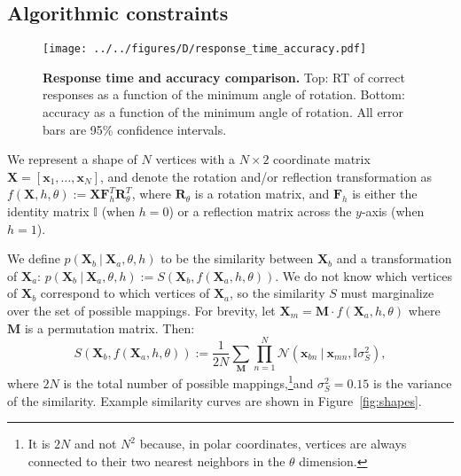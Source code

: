 \documentclass[10pt,letterpaper]{article}
\newcommand{\Xa}[0]{\mathbf{X}_a}
\newcommand{\Xb}[0]{\mathbf{X}_b}
\newcommand{\R}[0]{\mathbf{R}_\theta}
\newcommand{\F}[0]{\mathbf{F}}
\newcommand{\M}[0]{\mathbf{M}}
\newcommand{\I}[0]{\mathbb{I}}
\newcommand{\hi}[0]{h=0}
\newcommand{\hf}[0]{h=1}
\begin{document}
\subsection{Algorithmic constraints}

\begin{figure*}[t]
  \begin{center}
    \texttt{[image: ../../figures/D/response\_time\_accuracy.pdf]}
    \caption{\textbf{Response time and accuracy comparison.} Top: RT
      of correct responses as a function of the minimum angle of
      rotation. Bottom: accuracy as a function of the minimum angle of
      rotation. All error bars are 95\% confidence intervals.}
    \label{fig:response-time-accuracy}
  \end{center}
\end{figure*}

We represent a shape of $N$ vertices with a $N\times 2$ coordinate
matrix $\mathbf{X}=[\mathbf{x}_1, \ldots{}, \mathbf{x}_N]$, and denote
the rotation and/or reflection transformation as $f(\mathbf{X}, h,
\theta):=\mathbf{X}\F_h^T\R^T$, where $\R$ is a rotation matrix, and
$\F_h$ is either the identity matrix $\I$ (when $\hi$) or a reflection
matrix across the $y$-axis (when $\hf$).

We define $p(\Xb\ \vert\ \Xa, \theta, h)$ to be the similarity between
$\Xb$ and a transformation of $\Xa$: $p(\Xb\ \vert\ \Xa, \theta, h):=
S(\Xb, f(\Xa, h, \theta))$.  We do not know which vertices of $\Xb$
correspond to which vertices of $\Xa$, so the similarity $S$ must
marginalize over the set of possible mappings. For brevity, let
$\mathbf{X}_m=\M\cdot{}f(\Xa, h, \theta)$ where $\M$ is a permutation
matrix. Then:
\begin{equation}
  S(\Xb, f(\Xa, h, \theta)):=\frac{1}{2N} \sum_{\M} \prod_{n=1}^N \mathcal{N}(\mathbf{x}_{bn}\ \vert \ \mathbf{x}_{mn}, \I\sigma_S^2),
  \label{eq:similarity}
\end{equation}
where $2N$ is the total number of possible mappings,\footnote{It is
  $2N$ and not $N^2$ because, in polar coordinates, vertices are
  always connected to their two nearest neighbors in the $\theta$
  dimension.}and $\sigma_S^2=0.15$ is the variance of the
similarity. Example similarity curves are shown in
Figure~\ref{fig:shapes}.
\end{document}
